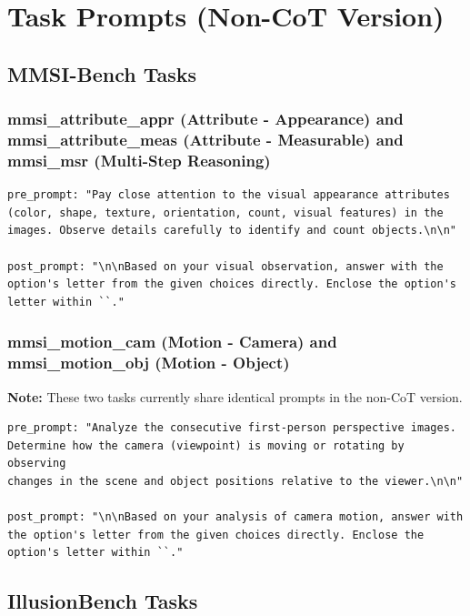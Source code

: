 \documentclass{article}
\theoremstyle{plain}
\theoremstyle{definition}
\theoremstyle{remark}
\begin{document}
\section{Task Prompts (Non-CoT Version)}
\label{app:non-cot}

\subsection{MMSI-Bench Tasks}

\subsubsection{mmsi\_attribute\_appr (Attribute - Appearance) and mmsi\_attribute\_meas (Attribute - Measurable) and mmsi\_msr (Multi-Step Reasoning)}

\begin{verbatim}
pre_prompt: "Pay close attention to the visual appearance attributes
(color, shape, texture, orientation, count, visual features) in the
images. Observe details carefully to identify and count objects.\n\n"

post_prompt: "\n\nBased on your visual observation, answer with the
option's letter from the given choices directly. Enclose the option's
letter within ``."
\end{verbatim}

\subsubsection{mmsi\_motion\_cam (Motion - Camera) and mmsi\_motion\_obj (Motion - Object)}

\textbf{Note:} These two tasks currently share identical prompts in the non-CoT version.

\begin{verbatim}
pre_prompt: "Analyze the consecutive first-person perspective images.
Determine how the camera (viewpoint) is moving or rotating by observing
changes in the scene and object positions relative to the viewer.\n\n"

post_prompt: "\n\nBased on your analysis of camera motion, answer with
the option's letter from the given choices directly. Enclose the
option's letter within ``."
\end{verbatim}

\subsection{IllusionBench Tasks}
\end{document}

